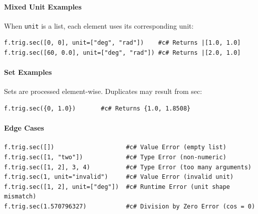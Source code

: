 \paragraph{Mixed Unit Examples}
When \texttt{unit} is a list, each element uses its corresponding unit:
\begin{verbatim}
f.trig.sec([0, 0], unit=["deg", "rad"])    #c# Returns |[1.0, 1.0]
f.trig.sec([60, 0.0], unit=["deg", "rad"]) #c# Returns |[2.0, 1.0]
\end{verbatim}

\paragraph{Set Examples}
Sets are processed element-wise. Duplicates may result from sec:
\begin{verbatim}
f.trig.sec({0, 1.0})       #c# Returns {1.0, 1.8508}
\end{verbatim}

\paragraph{Edge Cases}
\begin{verbatim}
f.trig.sec([])                    #c# Value Error (empty list)
f.trig.sec([1, "two"])            #c# Type Error (non-numeric)
f.trig.sec([1, 2], 3, 4)          #c# Type Error (too many arguments)
f.trig.sec(1, unit="invalid")     #c# Value Error (invalid unit)
f.trig.sec([1, 2], unit=["deg"])  #c# Runtime Error (unit shape mismatch)
f.trig.sec(1.570796327)           #c# Division by Zero Error (cos = 0)
\end{verbatim}

